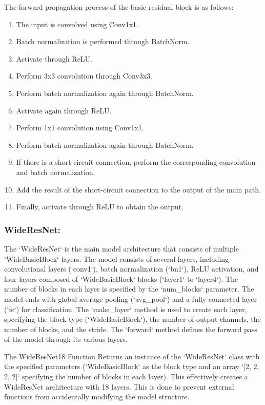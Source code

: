 \documentclass[twocolumn]{article}
\begin{document}
    The forward propagation process of the basic residual block is as follows:
    \begin{enumerate}
        \item The input is convolved using Conv1x1.
        \item Batch normalization is performed through BatchNorm.
        \item Activate through ReLU.
        \item Perform 3x3 convolution through Conv3x3.
        \item Perform batch normalization again through BatchNorm.
        \item Activate again through ReLU.
        \item Perform 1x1 convolution using Conv1x1.
        \item Perform batch normalization again through BatchNorm.
        \item If there is a short-circuit connection, perform the corresponding convolution and batch normalization.
        \item Add the result of the short-circuit connection to the output of the main path.
        \item Finally, activate through ReLU to obtain the output.
    \end{enumerate}
    
    \subsubsection{WideResNet:} 
    The `WideResNet` is the main model architecture that consists of multiple `WideBasicBlock` layers. The model consists of several layers, including convolutional layers (`conv1`), batch normalization (`bn1`), ReLU activation, and four layers composed of `WideBasicBlock` blocks (`layer1` to `layer4`). The number of blocks in each layer is specified by the `num\_blocks` parameter. The model ends with global average pooling (`avg\_pool`) and a fully connected layer (`fc`) for classification. The `make\_layer` method is used to create each layer, specifying the block type (`WideBasicBlock`), the number of output channels, the number of blocks, and the stride. The `forward` method defines the forward pass of the model through its various layers.

    The WideResNet18 Function Returns an instance of the `WideResNet` class with the specified parameters (`WideBasicBlock` as the block type and an array `[2, 2, 2, 2]` specifying the number of blocks in each layer). This effectively creates a WideResNet architecture with 18 layers. This is done to prevent external functions from accidentally modifying the model structure.
\end{document}
